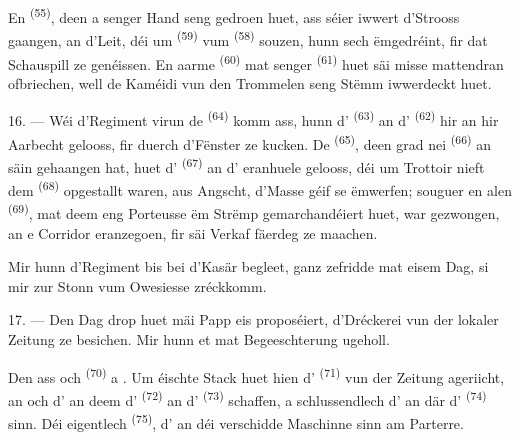 \VUsaut{3.0mm}

En  \textsuperscript{(55)}, deen a senger Hand seng
 gedroen huet, ass séier iwwert d'Strooss gaangen, an
d'Leit, déi um  \textsuperscript{(59)} vum 
\textsuperscript{(58)} souzen, hunn sech ëmgedréint, fir dat Schauspill ze
genéissen. En aarme  \textsuperscript{(60)} mat senger
 \textsuperscript{(61)} huet säi  misse
mattendran ofbriechen, well de Kaméidi vun den Trommelen seng Stëmm iwwerdeckt
huet.

16. --- Wéi d'Regiment virun de  \textsuperscript{(64)} komm ass,
hunn d' \textsuperscript{(63)} an d'
\textsuperscript{(62)} hir  an hir Aarbecht gelooss, fir duerch
d'Fënster ze kucken. De  \textsuperscript{(65)}, deen grad nei
 \textsuperscript{(66)} an säin  gehaangen hat, huet
d' \textsuperscript{(67)} an d' eranhuele gelooss, déi
um Trottoir nieft dem  \textsuperscript{(68)}
opgestallt waren, aus Angscht, d'Masse géif se ëmwerfen; souguer en alen
 \textsuperscript{(69)}, mat deem eng Porteusse ëm Strëmp
gemarchandéiert huet, war gezwongen, an e Corridor eranzegoen, fir säi Verkaf fäerdeg
ze maachen.

Mir hunn d'Regiment bis bei d'Kasär begleet,  ganz zefridde mat eisem
Dag, si mir zur Stonn vum Owesiesse zréckkomm.

\VUsaut{3.0mm}

17. --- Den Dag drop huet mäi Papp eis proposéiert, d'Dréckerei vun der lokaler
Zeitung ze besichen. Mir hunn et mat Begeeschterung ugeholl.

Den  ass och  \textsuperscript{(70)}
   a
. Um éischte Stack huet hien d'
\textsuperscript{(71)} vun der Zeitung ageriicht, an och d'
an deem d' \textsuperscript{(72)} an d'
\textsuperscript{(73)} schaffen, a schlussendlech d' an där
d' \textsuperscript{(74)} sinn. Déi eigentlech
 \textsuperscript{(75)}, d' an déi
verschidde Maschinne sinn am Parterre.

